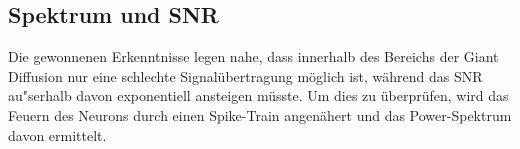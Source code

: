 \documentclass[12pt,a4paper]{article}
\begin{document}
\subsection{Spektrum und SNR}
Die gewonnenen Erkenntnisse legen nahe, dass innerhalb des Bereichs der Giant Diffusion nur eine schlechte Signalübertragung möglich ist, während das SNR au"serhalb davon exponentiell ansteigen müsste. Um dies zu überprüfen, wird das Feuern des Neurons durch einen Spike-Train angenähert und das Power-Spektrum davon ermittelt.
\begin{figure}[H]
	\hspace*{-0.5cm}
	\caption{}
	\label{spec}
\end{figure}
\end{document}
